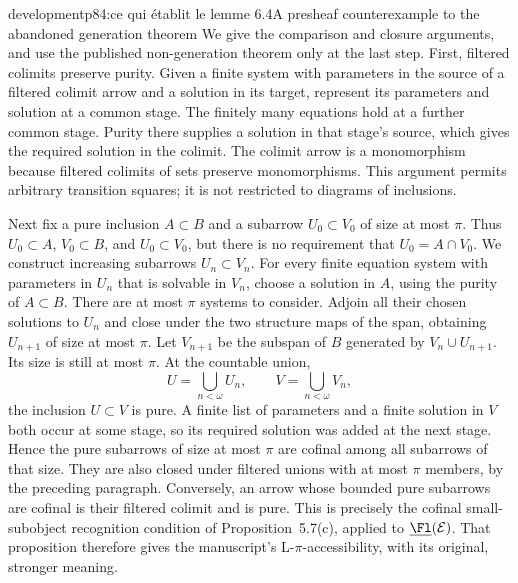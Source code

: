 \begin{dcomment}{development}{p84:ce qui établit le lemme 6.4}{A presheaf counterexample to the abandoned generation theorem}
We give the comparison and closure arguments, and use the published non-generation theorem only at the last step. First, filtered colimits preserve purity. Given a finite system with parameters in the source of a filtered colimit arrow and a solution in its target, represent its parameters and solution at a common stage. The finitely many equations hold at a further common stage. Purity there supplies a solution in that stage's source, which gives the required solution in the colimit. The colimit arrow is a monomorphism because filtered colimits of sets preserve monomorphisms. This argument permits arbitrary transition squares; it is not restricted to diagrams of inclusions.

Next fix a pure inclusion $A\subset B$ and a subarrow $U_0\subset V_0$ of size at most $\pi$. Thus $U_0\subset A$, $V_0\subset B$, and $U_0\subset V_0$, but there is no requirement that $U_0=A\cap V_0$. We construct increasing subarrows $U_n\subset V_n$. For every finite equation system with parameters in $U_n$ that is solvable in $V_n$, choose a solution in $A$, using the purity of $A\subset B$. There are at most $\pi$ systems to consider. Adjoin all their chosen solutions to $U_n$ and close under the two structure maps of the span, obtaining $U_{n+1}$ of size at most $\pi$. Let $V_{n+1}$ be the subspan of $B$ generated by $V_n\cup U_{n+1}$. Its size is still at most $\pi$. At the countable union,
\[
U=\bigcup_{n<\omega}U_n,\qquad V=\bigcup_{n<\omega}V_n,
\]
the inclusion $U\subset V$ is pure. A finite list of parameters and a finite solution in $V$ both occur at some stage, so its required solution was added at the next stage. Hence the pure subarrows of size at most $\pi$ are cofinal among all subarrows of that size. They are also closed under filtered unions with at most $\pi$ members, by the preceding paragraph. Conversely, an arrow whose bounded pure subarrows are cofinal is their filtered colimit and is pure. This is precisely the cofinal small-subobject recognition condition of Proposition~5.7(c), applied to $\underline{\Fl}(\mathcal E)$. That proposition therefore gives the manuscript's L-$\pi$-accessibility, with its original, stronger meaning.


\end{dcomment}
